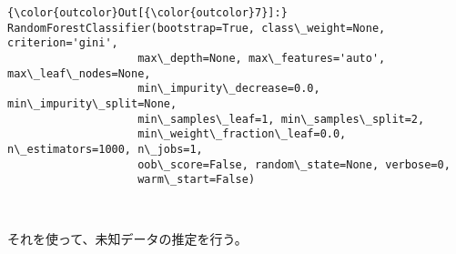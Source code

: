 \documentclass[11pt]{article}
\begin{document}
\begin{Verbatim}[commandchars=\\\{\}]
{\color{outcolor}Out[{\color{outcolor}7}]:} RandomForestClassifier(bootstrap=True, class\_weight=None, criterion='gini',
                    max\_depth=None, max\_features='auto', max\_leaf\_nodes=None,
                    min\_impurity\_decrease=0.0, min\_impurity\_split=None,
                    min\_samples\_leaf=1, min\_samples\_split=2,
                    min\_weight\_fraction\_leaf=0.0, n\_estimators=1000, n\_jobs=1,
                    oob\_score=False, random\_state=None, verbose=0,
                    warm\_start=False)
\end{Verbatim}
            
    \begin{center}
    \end{center}
    { \hspace*{\fill} \\}
    
    それを使って、未知データの推定を行う。
\end{document}
